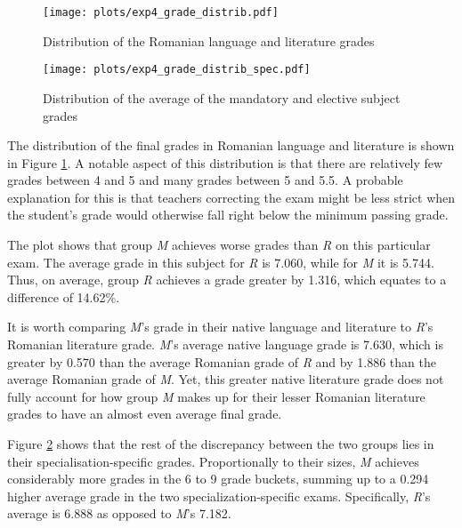  
\begin{figure}[!b]
    \centering
    \texttt{[image: plots/exp4\_grade\_distrib.pdf]}
    \caption{Distribution of the Romanian language and literature grades}
    \label{fig:ro-distr}
\end{figure}

\begin{figure}[!b]
    \centering
    \texttt{[image: plots/exp4\_grade\_distrib\_spec.pdf]}
    \caption{Distribution of the average of the mandatory and elective subject grades}
    \label{fig:subj-distr}
\end{figure}


The distribution of the final grades in Romanian language and literature is shown in Figure \ref{fig:ro-distr}. A notable aspect of this distribution is that there are relatively few grades between 4 and 5 and many grades between 5 and 5.5. A probable explanation for this is that teachers correcting the exam might be less strict when the student's grade would otherwise fall right below the minimum passing grade.

The plot shows that group \textit{M} achieves worse grades than \textit{R} on this particular exam. The average grade in this subject for \textit{R} is 7.060, while for \textit{M} it is 5.744. Thus, on average, group \textit{R} achieves a grade greater by 1.316, which equates to a difference of 14.62\%.


It is worth comparing \textit{M}'s grade in their native language and literature to \textit{R}'s Romanian literature grade. \textit{M}'s average native language grade is 7.630, which is greater by 0.570 than the average Romanian grade of \textit{R} and by 1.886 than the average Romanian grade of \textit{M}. Yet, this greater native literature grade does not fully account for how group \textit{M} makes up for their lesser Romanian literature grades to have an almost even average final grade. 

Figure \ref{fig:subj-distr} shows that the rest of the discrepancy between the two groups lies in their specialisation-specific grades. Proportionally to their sizes, \textit{M} achieves considerably more grades in the 6 to 9 grade buckets, summing up to a 0.294 higher average grade in the two specialization-specific exams. Specifically, \textit{R}'s average is 6.888 as opposed to \textit{M}'s 7.182.

